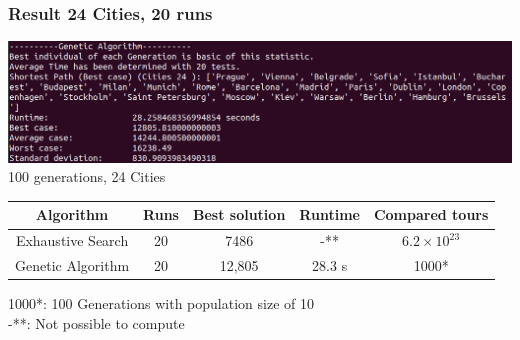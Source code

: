 \documentclass[10pt,a4paper]{article}
\begin{document}
	
	\subsubsection{Result 24 Cities, 20 runs}
	\begin{center}
		\includegraphics[width=1\linewidth]{pictures/geneticAlgorithm/cities24}
		\\
		100 generations, 24 Cities
		\\
	\end{center}
		\begin{center}
		\begin{tabular}{ | c |c | c | c | c|}
			\hline
			Algorithm & Runs & Best solution & Runtime & Compared tours \\ \hline
			Exhaustive Search & 20 & 7486 & -**  & $6.2\times10^{23}$ \\ \hline
			Genetic Algorithm & 20 & 12,805 & 28.3 s & 1000* \\ 
			\hline
		\end{tabular}
	\end{center}
	1000*: 100 Generations with population size of 10 \\
	-**: Not possible to compute
	
	
\end{document}
